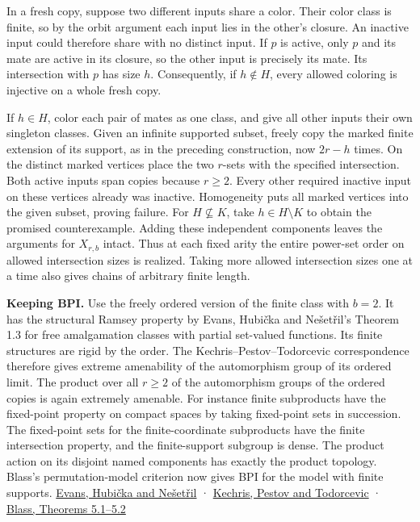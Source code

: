 \documentclass[11pt]{article}
\begin{document}
In a fresh copy, suppose two different inputs share a color. Their color class is finite, so by the orbit argument each input lies in the other's closure. An inactive input could therefore share with no distinct input. If \(p\) is active, only \(p\) and its mate are active in its closure, so the other input is precisely its mate. Its intersection with \(p\) has size \(h\). Consequently, if \(h\notin H\), every allowed coloring is injective on a whole fresh copy.

If \(h\in H\), color each pair of mates as one class, and give all other inputs their own singleton classes. Given an infinite supported subset, freely copy the marked finite extension of its support, as in the preceding construction, now \(2r-h\) times. On the distinct marked vertices place the two \(r\)-sets with the specified intersection. Both active inputs span copies because \(r\ge2\). Every other required inactive input on these vertices already was inactive. Homogeneity puts all marked vertices into the given subset, proving failure. For \(H\nsubseteq K\), take \(h\in H\setminus K\) to obtain the promised counterexample. Adding these independent components leaves the arguments for \(X_{r,b}\) intact. Thus at each fixed arity the entire power-set order on allowed intersection sizes is realized. Taking more allowed intersection sizes one at a time also gives chains of arbitrary finite length.

\textbf{Keeping BPI.} Use the freely ordered version of the finite class with \(b=2\). It has the structural Ramsey property by Evans, Hubička and Nešetřil's Theorem 1.3 for free amalgamation classes with partial set-valued functions. Its finite structures are rigid by the order. The Kechris--Pestov--Todorcevic correspondence therefore gives extreme amenability of the automorphism group of its ordered limit. The product over all \(r\ge2\) of the automorphism groups of the ordered copies is again extremely amenable. For instance finite subproducts have the fixed-point property on compact spaces by taking fixed-point sets in succession. The fixed-point sets for the finite-coordinate subproducts have the finite intersection property, and the finite-support subgroup is dense. The product action on its disjoint named components has exactly the product topology. Blass's permutation-model criterion now gives BPI for the model with finite supports. \href{https://arxiv.org/abs/1705.02379}{Evans, Hubička and Nešetřil} · \href{https://arxiv.org/abs/math/0305241}{Kechris, Pestov and Todorcevic} · \href{https://janos.cs.technion.ac.il/RESEARCH/AMS-Book-files/pdfs/11_Blass.pdf}{Blass, Theorems 5.1--5.2}
\end{document}
